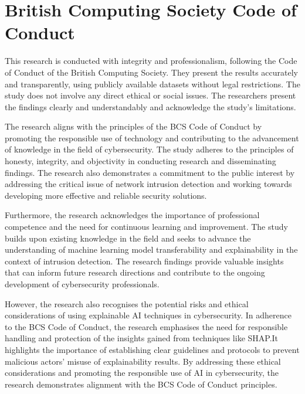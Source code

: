 \section{British Computing Society Code of Conduct}
This research is conducted with integrity and professionalism, following the Code of Conduct of the British Computing Society. They present the results accurately and transparently, using publicly available datasets without legal restrictions. The study does not involve any direct ethical or social issues. The researchers present the findings clearly and understandably and acknowledge the study's limitations.

The research aligns with the principles of the BCS Code of Conduct by promoting the responsible use of technology and contributing to the advancement of knowledge in the field of cybersecurity. The study adheres to the principles of honesty, integrity, and objectivity in conducting research and disseminating findings. The research also demonstrates a commitment to the public interest by addressing the critical issue of network intrusion detection and working towards developing more effective and reliable security solutions.

Furthermore, the research acknowledges the importance of professional competence and the need for continuous learning and improvement. The study builds upon existing knowledge in the field and seeks to advance the understanding of machine learning model transferability and explainability in the context of intrusion detection. The research findings provide valuable insights that can inform future research directions and contribute to the ongoing development of cybersecurity professionals.

However, the research also recognises the potential risks and ethical considerations of using explainable AI techniques in cybersecurity. In adherence to the BCS Code of Conduct, the research emphasises the need for responsible handling and protection of the insights gained from techniques like SHAP.\@ It highlights the importance of establishing clear guidelines and protocols to prevent malicious actors' misuse of explainability results. By addressing these ethical considerations and promoting the responsible use of AI in cybersecurity, the research demonstrates alignment with the BCS Code of Conduct principles.